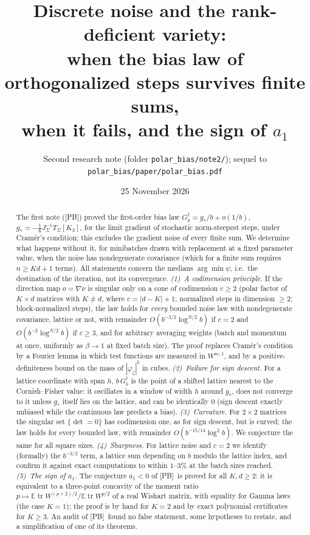 \documentclass[10pt]{article}
\title{\vspace{-2em}Discrete noise and the rank-deficient variety:\\
when the bias law of orthogonalized steps survives finite sums,\\ when it fails, and the sign of $a_1$}
\author{Second research note (folder \texttt{polar\_bias/note2/}); sequel to \texttt{polar\_bias/paper/polar\_bias.pdf}}
\date{25 November 2026}
\theoremstyle{definition}
\theoremstyle{remark}
\newcommand{\E}{\mathbb{E}}
\newcommand{\tr}{\operatorname{tr}}
\newcommand{\st}{\dagger}
\newcommand{\PB}{\textup{[PB]}}
\begin{document}
\maketitle

\begin{abstract}
The first note (\PB) proved the first-order bias law $G^\st_b=g_\ast/b+o(1/b)$,
$g_\ast=-\frac16J_\Sigma^{-1}T_\Sigma[K_3]$, for the limit gradient of stochastic norm-steepest steps, under Cram\'er's
condition; this excludes the gradient noise of every finite sum. We determine what happens without it, for minibatches drawn with replacement at a fixed parameter value, when the noise has nondegenerate covariance (which for a finite sum requires $n\ge Kd+1$ terms). All statements concern the medians $\arg\min\psi$, i.e.\ the destination of the iteration, not its convergence.
\emph{(1)~A codimension principle.} If the direction map $o=\nabla\nu$ is singular only on a cone of codimension
$c\ge2$ (polar factor of $K\times d$ matrices with $K\ne d$, where $c=|d-K|+1$; normalized steps in dimension $\ge2$;
block-normalized steps), the law holds for \emph{every} bounded noise law with nondegenerate covariance, lattice or not,
with remainder $O(b^{-3/2}\log^{N/2}b)$ if $c=2$ and $O(b^{-2}\log^{N/2}b)$ if $c\ge3$, and for arbitrary averaging weights
(batch and momentum at once, uniformly as $\beta\to1$ at fixed batch size). The proof replaces Cram\'er's condition by a
Fourier lemma in which test functions are measured in $W^{m,1}$, and by a positive-definiteness bound on the mass of
$|\varphi_\zeta|^b$ in cubes. \emph{(2)~Failure for sign descent.} For a lattice coordinate with span $h$, $b\,G^\st_b$
is the point of a shifted lattice nearest to the Cornish--Fisher value: it oscillates in a window of width $h$ around
$g_\ast$, does not converge to it unless $g_\ast$ itself lies on the lattice, and can be identically $0$ (sign descent exactly unbiased while the continuous law
predicts a bias). \emph{(3)~Curvature.} For $2\times2$ matrices the singular set $\{\det=0\}$ has codimension one, as for
sign descent, but is curved; the law holds for every bounded law, with remainder $O(b^{-15/14}\log^2b)$.
We conjecture the same for all square sizes. \emph{(4)~Sharpness.} For lattice noise and $c=2$ we identify (formally) the
$b^{-3/2}$ term, a lattice sum depending on $b$ modulo the lattice index, and confirm it against exact computations to
within $1$--$3\%$ at the batch sizes reached. \emph{(5)~The sign of $a_1$.} The conjecture $a_1<0$ of \PB\ is proved for all $K,d\ge2$: it is equivalent
to a three-point concavity of the moment ratio $p\mapsto\E\tr W^{(p+2)/2}/\E\tr W^{p/2}$ of a real Wishart matrix, with
equality for Gamma laws (the case $K=1$); the proof is by hand for $K=2$ and by exact polynomial certificates for
$K\ge3$. An audit of \PB\ found no false statement, some hypotheses to restate, and a simplification of one of its theorems.
\end{abstract}
\end{document}
